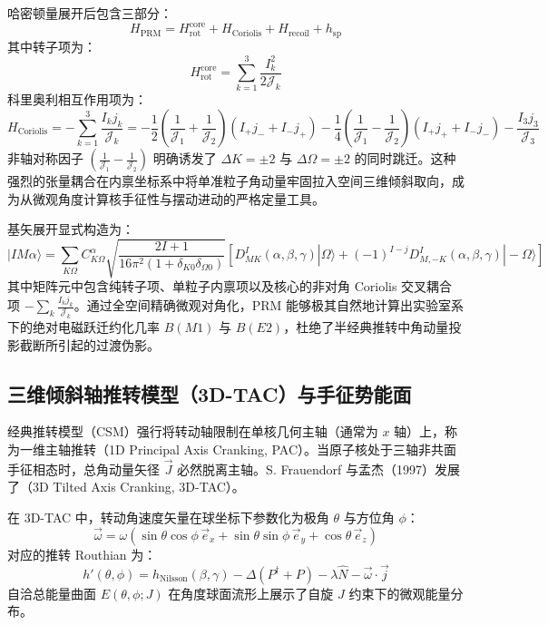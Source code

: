 哈密顿量展开后包含三部分：
\begin{equation}
    H_{\text{PRM}} = H_{\text{rot}}^{\text{core}} + H_{\text{Coriolis}} + H_{\text{recoil}} + h_{\text{sp}}
    \label{eq:prm_expanded}
\end{equation}
其中转子项为：
\begin{equation}
    H_{\text{rot}}^{\text{core}} = \sum_{k=1}^3 \frac{I_k^2}{2\mathcal{J}_k}
\end{equation}
科里奥利相互作用项为：
\begin{equation}
    H_{\text{Coriolis}} = -\sum_{k=1}^3 \frac{I_k j_k}{\mathcal{J}_k} = -\frac{1}{2} \left( \frac{1}{\mathcal{J}_1} + \frac{1}{\mathcal{J}_2} \right) (I_+ j_- + I_- j_+) - \frac{1}{4} \left( \frac{1}{\mathcal{J}_1} - \frac{1}{\mathcal{J}_2} \right) (I_+ j_+ + I_- j_-) - \frac{I_3 j_3}{\mathcal{J}_3}
    \label{eq:prm_coriolis}
\end{equation}
非轴对称因子 $\left( \frac{1}{\mathcal{J}_1} - \frac{1}{\mathcal{J}_2} \right)$ 明确诱发了 $\Delta K = \pm 2$ 与 $\Delta \Omega = \pm 2$ 的同时跳迁。这种强烈的张量耦合在内禀坐标系中将单准粒子角动量牢固拉入空间三维倾斜取向，成为从微观角度计算核手征性与摆动进动的严格定量工具。

基矢展开显式构造为：
\begin{equation}
    |I M \alpha\rangle = \sum_{K \Omega} C_{K \Omega}^\alpha \sqrt{\frac{2I+1}{16\pi^2 (1 + \delta_{K 0}\delta_{\Omega 0})}} \left[ D_{M K}^I(\alpha, \beta, \gamma) |\Omega\rangle + (-1)^{I-j} D_{M,-K}^I(\alpha, \beta, \gamma) |-\Omega\rangle \right]
    \label{eq:prm_basis}
\end{equation}
其中矩阵元中包含纯转子项、单粒子内禀项以及核心的非对角 Coriolis 交叉耦合项 $-\sum_k \frac{I_k j_k}{\mathcal{J}_k}$。通过全空间精确微观对角化，PRM 能够极其自然地计算出实验室系下的绝对电磁跃迁约化几率 $B(M1)$ 与 $B(E2)$，杜绝了半经典推转中角动量投影截断所引起的过渡伪影。

\subsection{三维倾斜轴推转模型（3D-TAC）与手征势能面}

经典推转模型（CSM）强行将转动轴限制在单核几何主轴（通常为 $x$ 轴）上，称为一维主轴推转（1D Principal Axis Cranking, PAC）。当原子核处于三轴非共面手征相态时，总角动量矢径 $\vec{J}$ 必然脱离主轴。S. Frauendorf 与孟杰（1997）发展了（3D Tilted Axis Cranking, 3D-TAC）。

在 3D-TAC 中，转动角速度矢量在球坐标下参数化为极角 $\theta$ 与方位角 $\phi$：
\begin{equation}
    \vec{\omega} = \omega (\sin\theta \cos\phi\, \vec{e}_x + \sin\theta \sin\phi\, \vec{e}_y + \cos\theta\, \vec{e}_z)
    \label{eq:3d_tac_omega}
\end{equation}
对应的推转 Routhian 为：
\begin{equation}
    h'(\theta, \phi) = h_{\text{Nilsson}}(\beta, \gamma) - \Delta (P^\dagger + P) - \lambda \hat{N} - \vec{\omega} \cdot \vec{j}
    \label{eq:3d_tac_routhian}
\end{equation}
自洽总能量曲面 $E(\theta, \phi; J)$ 在角度球面流形上展示了自旋 $J$ 约束下的微观能量分布。

